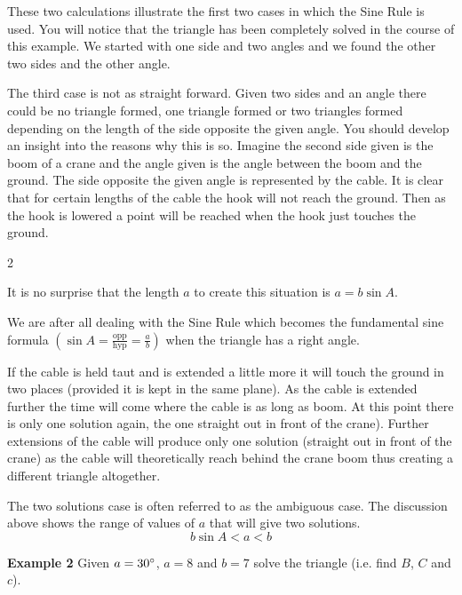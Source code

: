 These two calculations illustrate the first two cases in which the Sine Rule is used. You will notice that the triangle has been completely solved in the course of this example. We started with one side and two angles and we found the other two sides and the other angle. 

The third case is not as straight forward. Given two sides and an angle there could be no triangle formed, one triangle formed or two triangles formed depending on the length of the side opposite the given angle. You should develop an insight into the reasons why this is so. Imagine the second side given is the boom of a crane and the angle given is the angle between the boom and the ground. The side opposite the given angle is represented by the cable. It is clear that for certain lengths of the cable the hook will not reach the ground. Then as the hook is lowered a point will be reached when the hook just touches the ground.  

\columnsep =30pt
\begin {multicols}{2}
\setlength\fboxrule{0in}\setlength\fboxsep{0.2in}

It is no surprise that the length $a$ to create this situation is $a =b \sin  A\text{.}$ 

We are after all dealing with the Sine Rule which becomes the fundamental sine formula $\left (\sin  A =\frac{\text{opp}}{\text{hyp}} =\frac{a}{b}\right )$ when the triangle has a right angle. 
\end {multicols}

If the cable is held taut and is extended a little more it will touch the ground in two places (provided it is kept in the same plane). As the cable is extended further the time will come where the cable is as long as boom. At this point there is only one solution again, the one straight out in front of the crane). Further extensions of the cable will produce only one solution (straight out in front of the crane) as the cable will theoretically reach behind the crane boom thus creating a different triangle altogether. 

The two solutions case is often referred to as the ambiguous case. The discussion above shows the range of values of $a$ that will give two solutions.
\begin{equation*}b \sin  A <a <b
\end{equation*}

\textbf{Example 2} Given $a =30 \mbox{{\ensuremath{{}^\circ}}}$, $a =8$ and $b =7$ solve the triangle (i.e. find $B$, $C$ and $c$).    
\setlength\fboxrule{0in}\setlength\fboxsep{0.2in}


